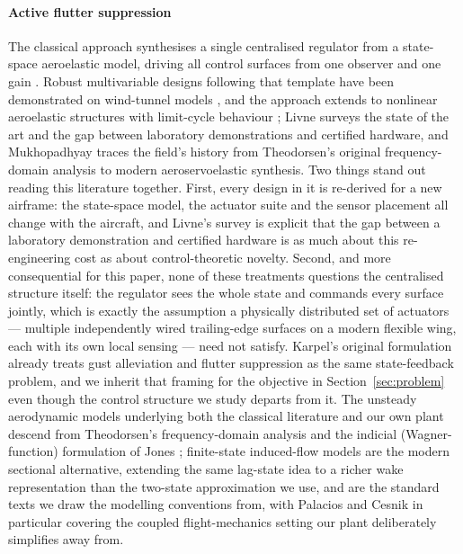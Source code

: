 \documentclass[preprint,11pt,authoryear]{elsarticle}
\begin{document}
\paragraph{Active flutter suppression}
The classical approach synthesises a single centralised regulator from a
state-space aeroelastic model, driving all control surfaces from one observer
and one gain \citep{karpel1982design}. Robust multivariable designs following
that template have been demonstrated on wind-tunnel models
\citep{waszak2001robust}, and the approach extends to nonlinear aeroelastic
structures with limit-cycle behaviour \citep{block1998applied}; Livne
\citep{livne2018flutter} surveys the state of the art and the gap between
laboratory demonstrations and certified hardware, and Mukhopadhyay
\citep{mukhopadhyay2003historical} traces the field's history from Theodorsen's
original frequency-domain analysis to modern aeroservoelastic synthesis. Two
things stand out reading this literature together. First, every design in it is
re-derived for a new airframe: the state-space model, the actuator suite and
the sensor placement all change with the aircraft, and Livne's survey is
explicit that the gap between a laboratory demonstration and certified hardware
is as much about this re-engineering cost as about control-theoretic novelty.
Second, and more consequential for this paper, none of these treatments
questions the centralised structure itself: the regulator sees the whole state
and commands every surface jointly, which is exactly the assumption a
physically distributed set of actuators --- multiple independently wired
trailing-edge surfaces on a modern flexible wing, each with its own local
sensing --- need not satisfy. Karpel's original formulation
\citep{karpel1982design} already treats gust alleviation and flutter
suppression as the same state-feedback problem, and we inherit that framing for
the objective in Section~\ref{sec:problem} even though the control structure we
study departs from it. The unsteady aerodynamic models underlying both the
classical literature and our own plant descend from Theodorsen's
frequency-domain analysis \citep{theodorsen1935} and the indicial
(Wagner-function) formulation of Jones \citep{jones1940}; finite-state
induced-flow models \citep{peters1995finite} are the modern sectional
alternative, extending the same lag-state idea to a richer wake representation
than the two-state approximation we use, and
\citep{fung1955,bisplinghoff1955,palacios2023flexible} are the standard texts we
draw the modelling conventions from, with Palacios and Cesnik
\citep{palacios2023flexible} in particular covering the coupled
flight-mechanics setting our plant deliberately simplifies away from.
\end{document}

